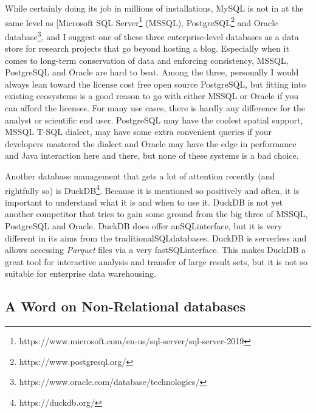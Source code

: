 \documentclass[
  12pt,
  letterpaper,
]{krantz}
\begin{document}
While certainly doing its job in millions of installations, MySQL is not
in at the same level as {[}Microsoft SQL
Server\footnote{https://www.microsoft.com/en-us/sql-server/sql-server-2019}
(MSSQL), PostgreSQL\footnote{https://www.postgresql.org/}
and Oracle database\footnote{https://www.oracle.com/database/technologies/},
and I suggest one of these three enterprise-level
databases as a data store for research projects that go
beyond hosting a blog. Especially when it comes to
long-term conservation of data and enforcing consistency,
MSSQL, PostgreSQL and
Oracle are hard to beat. Among the three, personally I
would always lean toward the license cost free open source PostgreSQL,
but fitting into existing ecosystems is a good reason to go with either
MSSQL or Oracle if you can afford the licenses. For many use cases,
there is hardly any difference for the analyst or scientific end user.
PostgreSQL may have the coolest spatial support, MSSQL T-SQL dialect,
may have some extra convenient queries if your developers mastered the
dialect and Oracle may have the edge in performance and Java interaction
here and there, but none of these systems is a bad choice.

Another database management that gets a lot of attention
recently (and rightfully so) is DuckDB\footnote{https://duckdb.org/}.
Because it is mentioned so positively and often, it is important to
understand what it is and when to use it. DuckDB is not yet another
competitor that tries to gain some ground from the big three of MSSQL,
PostgreSQL and Oracle. DuckDB does offer anSQLinterface, but
it is very different in its aims from the
traditionalSQLdatabases. DuckDB
is serverless and allows accessing \emph{Parquet} files
via a very fastSQLinterface. This makes DuckDB a great tool
for interactive analysis and transfer of large result sets, but it is
not so suitable for enterprise data warehousing.

\hypertarget{a-word-on-non-relational-databases}{%
\subsection{\texorpdfstring{A Word on Non-Relational
databases}{A Word on Non-Relational databases}}\label{a-word-on-non-relational-databases}}
\end{document}
